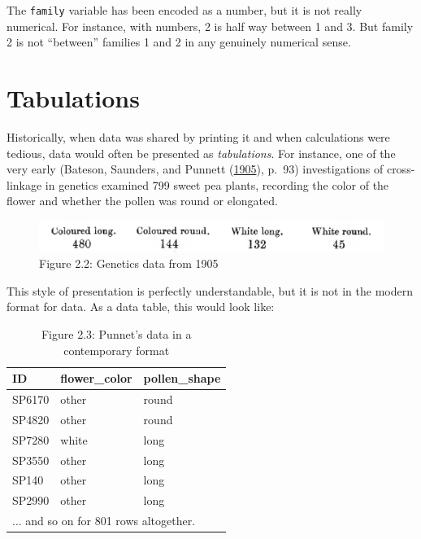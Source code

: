 \documentclass[]{tufte-book}
\begin{document}
The \texttt{family} variable has been encoded as a number, but it is not really numerical. For instance, with numbers, 2 is half way between 1 and 3. But family 2 is not ``between'' families 1 and 2 in any genuinely numerical sense.

\hypertarget{tabulations}{%
\section{Tabulations}\label{tabulations}}

Historically, when data was shared by printing it and when calculations were tedious, data would often be presented as \emph{tabulations}. For instance, one of the very early (Bateson, Saunders, and Punnett (\protect\hyperlink{ref-punnett-1905}{1905}), p.~93) investigations of cross-linkage in genetics examined 799 sweet pea plants, recording the color of the flower and whether the pollen was round or elongated.

\begin{figure}\includegraphics[width=0.8\linewidth]{images/Punnet-page-93} \caption[Figure 2.2]{Figure 2.2: Genetics data from 1905}\label{fig:punnett-93}
\end{figure}

This style of presentation is perfectly understandable, but it is not in the modern format for data. As a data table, this would look like:

\begin{table}

\caption{\label{tab:punnet-raw}Figure 2.3: Punnet's data in a contemporary format}
\centering
\begin{tabular}[t]{l|l|l}
\hline
ID & flower\_color & pollen\_shape\\
\hline
SP6170 & other & round\\
\hline
SP4820 & other & round\\
\hline
SP7280 & white & long\\
\hline
SP3550 & other & long\\
\hline
SP140 & other & long\\
\hline
SP2990 & other & long\\
\hline
\multicolumn{3}{l}{... and so on for 801 rows altogether.}\\
\end{tabular}
\end{table}
\end{document}
